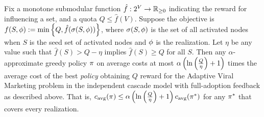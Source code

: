 \begin{theorem} \label{thm:viral-marketing-min-cost-cover}
Fix a monotone submodular function $\hat{f}:2^V \to
\mathbb{R}_{\ge 0}$ indicating 
the reward for
influencing a set, and a quota $Q \le \hat{f}(V)$.
Suppose the objective is
$f(S, {\color{black}{\ensuremath{\phi}}}) := \min\left\{Q, \hat{f}(\sigma(S, {\color{black}{\ensuremath{\phi}}}))\right\}$, where
 $\sigma(S, {\color{black}{\ensuremath{\phi}}})$ is the set of all activated nodes 
when $S$ is the seed set of activated nodes and ${\color{black}{\ensuremath{\phi}}}$
is the realization.  
Let $\eta$ be any value such that 
$\hat{f}(S) > Q - \eta$ implies $\hat{f}(S) \ge Q$ for all $S$.
Then any $\alpha$-approximate greedy policy $\pi$ on average costs at most
$\alpha \left( {\ln  \left( {\frac{Q}{\eta}} \right)  + 1} \right) $ times the average cost of  
the best \emph{policy} obtaining $Q$ reward
for the Adaptive Viral Marketing problem 
in the independent cascade model with 
full-adoption feedback as
described above.
That is, 
${c_{\text{avg}}{(\pi)}} \le \alpha \left( {\ln  \left( {\frac{Q}{\eta}} \right)  +
  1} \right) {c_{\text{avg}}{(\pi^*)}}$
for any $\pi^*$ that covers every realization.
\end{theorem}


